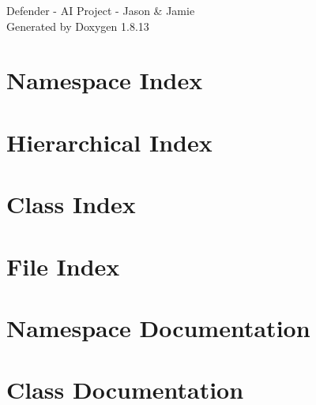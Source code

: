 \documentclass[twoside]{book}
\newcommand{\+}{\discretionary{\mbox{\scriptsize$\hookleftarrow$}}{}{}}
\newcommand{\clearemptydoublepage}{%
  \newpage{\pagestyle{empty}\cleardoublepage}%
}
\begin{document}
\hypersetup{pageanchor=false,
             bookmarksnumbered=true,
             pdfencoding=unicode
            }
\begin{titlepage}
\vspace*{7cm}
\begin{center}%
{\Large Defender -\/ AI Project -\/ Jason \& Jamie }\\
\vspace*{1cm}
{\large Generated by Doxygen 1.8.13}\\
\end{center}
\end{titlepage}
\clearemptydoublepage
{}
\tableofcontents
\clearemptydoublepage
{}
\hypersetup{pageanchor=true}

\chapter{Namespace Index}

\chapter{Hierarchical Index}

\chapter{Class Index}

\chapter{File Index}

\chapter{Namespace Documentation}







\chapter{Class Documentation}



























\end{document}
